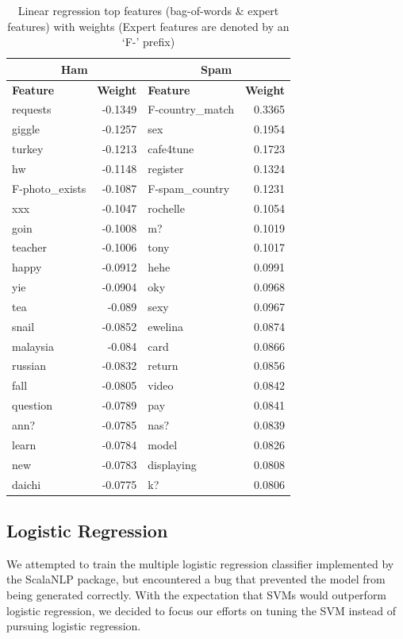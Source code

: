 \documentclass[preprint]{acm_proc_article-sp}
\begin{document}
\begin{table}
\small
\begin{tabular}{l|r||l|r}
\multicolumn{2}{c}{\textbf{Ham}} & 
\multicolumn{2}{c}{\textbf{Spam}} \\
\hline
\textbf{Feature} & \textbf{Weight} & \textbf{Feature} & \textbf{Weight} \\
\hline
requests & -0.1349 & F-country\_match & 0.3365\\
giggle & -0.1257 & sex & 0.1954\\
turkey & -0.1213 & cafe4tune & 0.1723\\
hw & -0.1148 & register & 0.1324\\
F-photo\_exists & -0.1087 & F-spam\_country & 0.1231\\
xxx & -0.1047 & rochelle & 0.1054\\
goin & -0.1008 & m? & 0.1019\\
teacher & -0.1006 & tony & 0.1017\\
happy & -0.0912 & hehe & 0.0991\\
yie & -0.0904 & oky & 0.0968\\
tea & -0.089 & sexy & 0.0967\\
snail & -0.0852 & ewelina & 0.0874\\
malaysia & -0.084 & card & 0.0866\\
russian & -0.0832 & return & 0.0856\\
fall & -0.0805 & video & 0.0842\\
question & -0.0789 & pay & 0.0841\\
ann? & -0.0785 & nas? & 0.0839\\
learn & -0.0784 & model & 0.0826\\
new & -0.0783 & displaying & 0.0808\\
daichi & -0.0775 & k?  & 0.0806\\
\end{tabular}
\caption{Linear regression top features (bag-of-words \& expert features) with weights (Expert features
are denoted by an `F-' prefix)}
\label{tab:lrfeatse}
\end{table}

\subsection{Logistic Regression}

We attempted to train the multiple logistic regression classifier implemented by the ScalaNLP package, 
but encountered a bug that prevented the model from being generated correctly. With the expectation 
that SVMs would outperform logistic regression, we decided to focus our efforts on tuning the SVM 
instead of pursuing logistic regression. 
\end{document}
